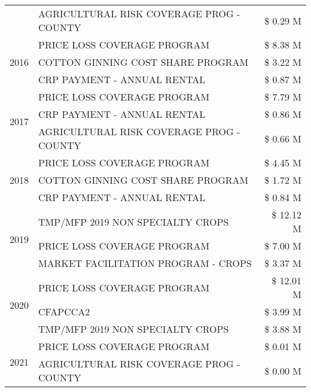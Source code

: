 \begin{tabular}{llr}
 & AGRICULTURAL RISK COVERAGE PROG - COUNTY & \$ 0.29 M \\
\cline{1-3}
\multirow[t]{3}{*}{2016} & PRICE LOSS COVERAGE PROGRAM                   & \$ 8.38 M \\
 & COTTON GINNING COST SHARE PROGRAM             & \$ 3.22 M \\
 & CRP PAYMENT - ANNUAL RENTAL                   & \$ 0.87 M \\
\cline{1-3}
\multirow[t]{3}{*}{2017} & PRICE LOSS COVERAGE PROGRAM & \$ 7.79 M \\
 & CRP PAYMENT - ANNUAL RENTAL & \$ 0.86 M \\
 & AGRICULTURAL RISK COVERAGE PROG - COUNTY & \$ 0.66 M \\
\cline{1-3}
\multirow[t]{3}{*}{2018} & PRICE LOSS COVERAGE PROGRAM & \$ 4.45 M \\
 & COTTON GINNING COST SHARE PROGRAM & \$ 1.72 M \\
 & CRP PAYMENT - ANNUAL RENTAL & \$ 0.84 M \\
\cline{1-3}
\multirow[t]{3}{*}{2019} & TMP/MFP 2019 NON SPECIALTY CROPS & \$ 12.12 M \\
 & PRICE LOSS COVERAGE PROGRAM & \$ 7.00 M \\
 & MARKET FACILITATION PROGRAM - CROPS & \$ 3.37 M \\
\cline{1-3}
\multirow[t]{3}{*}{2020} & PRICE LOSS COVERAGE PROGRAM & \$ 12.01 M \\
 & CFAPCCA2 & \$ 3.99 M \\
 & TMP/MFP 2019 NON SPECIALTY CROPS & \$ 3.88 M \\
\cline{1-3}
\multirow[t]{2}{*}{2021} & PRICE LOSS COVERAGE PROGRAM & \$ 0.01 M \\
 & AGRICULTURAL RISK COVERAGE PROG - COUNTY & \$ 0.00 M \\
\cline{1-3}
\bottomrule
\end{tabular}
